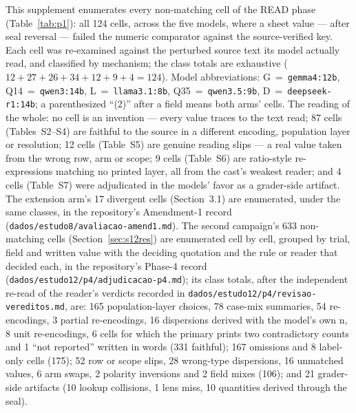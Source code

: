 \documentclass[11pt]{article}
\begin{document}
This supplement enumerates every non-matching cell of the READ phase (Table~\ref{tab:p1}): all 124 cells, across the five models, where a sheet value --- after seal reversal --- failed the numeric comparator against the source-verified key. Each cell was re-examined against the perturbed source text its model actually read, and classified by mechanism; the class totals are exhaustive ($12 + 27 + 26 + 34 + 12 + 9 + 4 = 124$). Model abbreviations: G~=~\texttt{gemma4:12b}, Q14~=~\texttt{qwen3:14b}, L~=~\texttt{llama3.1:8b}, Q35~=~\texttt{qwen3.5:9b}, D~=~\texttt{deepseek-r1:14b}; a parenthesized ``(2)'' after a field means both arms' cells. The reading of the whole: no cell is an invention --- every value traces to the text read; 87 cells (Tables~S2--S4) are faithful to the source in a different encoding, population layer or resolution; 12 cells (Table~S5) are genuine reading slips --- a real value taken from the wrong row, arm or scope; 9 cells (Table~S6) are ratio-style re-expressions matching no printed layer, all from the cast's weakest reader; and 4 cells (Table~S7) were adjudicated in the models' favor as a grader-side artifact. The extension arm's 17 divergent cells (Section~3.1) are enumerated, under the same classes, in the repository's Amendment-1 record (\texttt{dados/estudo8/avaliacao-amend1.md}). The second campaign's 633 non-matching cells (Section~\ref{sec:s12res}) are enumerated cell by cell, grouped by trial, field and written value with the deciding quotation and the rule or reader that decided each, in the repository's Phase-4 record (\texttt{dados/estudo12/p4/adjudicacao-p4.md}); its class totals, after the independent re-read of the reader's verdicts recorded in \texttt{dados/estudo12/p4/revisao-vereditos.md}, are: 165 population-layer choices, 78 case-mix summaries, 54 re-encodings, 3 partial re-encodings, 16 dispersions derived with the model's own n, 8 unit re-encodings, 6 cells for which the primary prints two contradictory counts and 1 ``not reported'' written in words (331 faithful); 167 omissions and 8 label-only cells (175); 52 row or scope slips, 28 wrong-type dispersions, 16 unmatched values, 6 arm swaps, 2 polarity inversions and 2 field mixes (106); and 21 grader-side artifacts (10 lookup collisions, 1 lens miss, 10 quantities derived through the seal).
\end{document}
